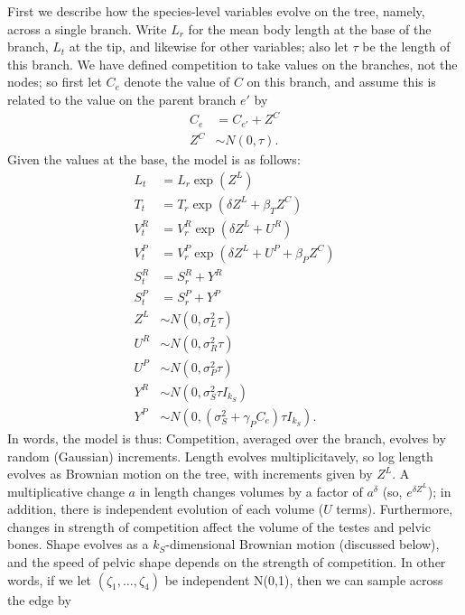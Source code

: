 \documentclass{article}
\begin{document}
First we describe how the species-level variables evolve on the tree,
namely, across a single branch.
Write $L_r$ for the mean body length at the base of the branch, $L_t$ at the tip,
and likewise for other variables;
also let $\tau$ be the length of this branch.
We have defined competition to take values on the branches, not the nodes;
so first let $C_e$ denote the value of $C$ on this branch, 
and assume this is related to the value on the parent branch $e'$ by
\begin{align}
    C_e &= C_{e'} + Z^C \\
    Z^C &\sim N(0,\tau) .
\end{align}
Given the values at the base, the model is as follows:
\begin{align}
    L_t &= L_r \exp( Z^L ) \\
    T_t &= T_r \exp( \delta Z^L + \beta_T Z^C ) \\
    V^R_t &= V^R_r \exp( \delta Z^L + U^R ) \\
    V^P_t &= V^P_r \exp( \delta Z^L + U^P + \beta_P Z^C ) \\
    S^R_t &= S^R_r + Y^R \\
    S^P_t &= S^P_r + Y^P \\
    Z^L &\sim N(0,\sigma^2_L \tau) \\
    U^R &\sim N(0,\sigma^2_R \tau) \\
    U^P &\sim N(0,\sigma^2_P \tau) \\
    Y^R &\sim N(0,\sigma^2_S \tau I_{k_S}) \\
    Y^P &\sim N(0,(\sigma^2_S +\gamma_P C_e) \tau I_{k_S}) .
\end{align}
In words, the model is thus:
Competition, averaged over the branch, evolves by random (Gaussian) increments.
Length evolves multiplicitavely,
so log length evolves as Brownian motion on the tree,
with increments given by $Z^L$.
A multiplicative change $a$ in length changes volumes by a factor of $a^\delta$ (so, $e^{\delta Z^L}$);
in addition, there is independent evolution of each volume ($U$ terms).
Furthermore, changes in strength of competition affect the volume of the testes and pelvic bones.
Shape evolves as a $k_S$-dimensional Brownian motion (discussed below),
and the speed of pelvic shape depends on the strength of competition.
In other words, if we let
$(\zeta_1, \ldots, \zeta_4)$ be independent N(0,1),
then we can sample across the edge by
\end{document}

